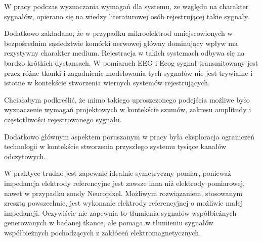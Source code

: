 \begin{frame}[t]
W pracy podczas wyznaczania wymagań dla systemu, ze względu na charakter sygnałów, opierano się na wiedzy literaturowej osób rejestrującej takie sygnały.

Dodatkowo zakładano, że w przypadku mikroelektrod umiejscowionych w bezpośrednim sąsiedztwie komórki nerwowej główny dominujący wpływ ma rezystywny charakter medium. 
Rejestracja w takich systemach odbywa się na bardzo krótkich dystansach.
W pomiarach EEG i Ecog sygnał transmitowany jest przez różne tkanki i zagadnienie modelowania tych sygnałów nie jest trywialne i istotne w kontekście stworzenia wiernych systemów rejestrujących.

Chciałabym podkreślić, że mimo takiego uproszczonego podejścia możliwe było wyznaczenie wymagań projektowych w kontekście szumów, zakresu amplitudy i częstotliwości rejestrowanego sygnału.

Dodatkowo głównym aspektem poruszanym w pracy była eksploracja ograniczeń technologii w kontekście stworzenia przyszłego systemu tysiące kanałów odczytowych.

\end{frame}
\begin{frame}[t]
    \begin{block}{\tb}
    \end{block}
    W praktyce trudno jest zapewnić idealnie symetryczny pomiar, ponieważ impedancja elektrody referencyjne jest zawsze inna niż elektrody pomiarowej, nawet w przypadku sondy Neuropixel. 
    Możliwym rozwiązaniem, stosowanym zresztą powszechnie, jest wykonanie elektrody referencyjnej o możliwie małej impedancji. 
    Oczywiście nie zapewnia to tłumienia sygnałów współbieżnych generowanych w badanej tkance, ale pomaga w tłumieniu sygnałów współbieżnych pochodzących z zakłóceń elektromagnetycznych. 
\end{frame}

